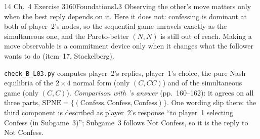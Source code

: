 \begin{exsol}{14}{\MG{} Ch.~4 Exercise 3}{160}{Foundations}{L3}
\interp Observing the other's move matters only when the best reply depends on it. Here it does
not: confessing is dominant at both of player~2's nodes, so the sequential game unravels
exactly as the simultaneous one, and the Pareto-better $(N,N)$ is still out of reach. Making a
move observable is a commitment device only when it changes what the follower wants to do (item~17,
Stackelberg).

\verify \texttt{check\_B\_L03.py} computes player~2's replies, player~1's choice, the pure Nash
equilibria of the $2\times4$ normal form (only $(C, CC)$) and of the simultaneous game (only
$(C,C)$). \emph{Comparison with \MG{}'s answer} (pp.~160--162): it agrees on all three parts,
$\text{SPNE} = \{(\text{Confess}, \text{Confess}, \text{Confess})\}$. One wording slip there: the
third component is described as player~2's response ``to player~1 selecting Confess (in
Subgame~3)''; Subgame~3 follows Not Confess, so it is the reply to Not Confess.

\end{exsol}
